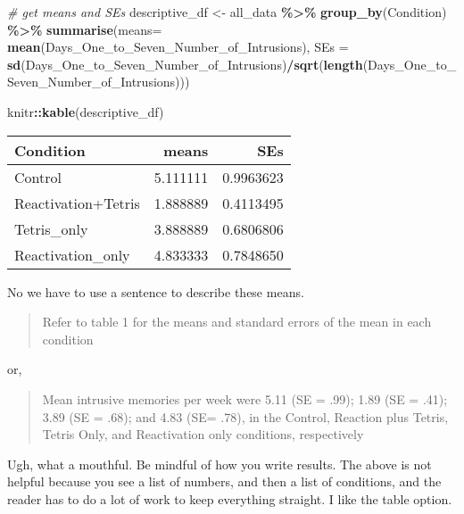 \documentclass[
]{book}
\newenvironment{Shaded}{\begin{snugshade}}{\end{snugshade}}
\newcommand{\AttributeTok}[1]{\textcolor[rgb]{0.13,0.29,0.53}{#1}}
\newcommand{\CommentTok}[1]{\textcolor[rgb]{0.56,0.35,0.01}{\textit{#1}}}
\newcommand{\FunctionTok}[1]{\textcolor[rgb]{0.13,0.29,0.53}{\textbf{#1}}}
\newcommand{\NormalTok}[1]{#1}
\newcommand{\OtherTok}[1]{\textcolor[rgb]{0.56,0.35,0.01}{#1}}
\newcommand{\SpecialCharTok}[1]{\textcolor[rgb]{0.81,0.36,0.00}{\textbf{#1}}}
\begin{document}
\begin{Shaded}
\begin{Highlighting}[]
\CommentTok{\# get means and SEs}
\NormalTok{descriptive\_df }\OtherTok{\textless{}{-}}\NormalTok{ all\_data }\SpecialCharTok{\%\textgreater{}\%} 
                    \FunctionTok{group\_by}\NormalTok{(Condition) }\SpecialCharTok{\%\textgreater{}\%} 
                    \FunctionTok{summarise}\NormalTok{(}\AttributeTok{means=} \FunctionTok{mean}\NormalTok{(Days\_One\_to\_Seven\_Number\_of\_Intrusions),}
                              \AttributeTok{SEs =} \FunctionTok{sd}\NormalTok{(Days\_One\_to\_Seven\_Number\_of\_Intrusions)}\SpecialCharTok{/}\FunctionTok{sqrt}\NormalTok{(}\FunctionTok{length}\NormalTok{(Days\_One\_to\_Seven\_Number\_of\_Intrusions)))}

\NormalTok{knitr}\SpecialCharTok{::}\FunctionTok{kable}\NormalTok{(descriptive\_df)}
\end{Highlighting}
\end{Shaded}

\begin{tabular}{l|r|r}
\hline
Condition & means & SEs\\
\hline
Control & 5.111111 & 0.9963623\\
\hline
Reactivation+Tetris & 1.888889 & 0.4113495\\
\hline
Tetris\_only & 3.888889 & 0.6806806\\
\hline
Reactivation\_only & 4.833333 & 0.7848650\\
\hline
\end{tabular}

No we have to use a sentence to describe these means.

\begin{quote}
Refer to table 1 for the means and standard errors of the mean in each condition
\end{quote}

or,

\begin{quote}
Mean intrusive memories per week were 5.11 (SE = .99); 1.89 (SE = .41); 3.89 (SE = .68); and 4.83 (SE= .78), in the Control, Reaction plus Tetris, Tetris Only, and Reactivation only conditions, respectively
\end{quote}

Ugh, what a mouthful. Be mindful of how you write results. The above is not helpful because you see a list of numbers, and then a list of conditions, and the reader has to do a lot of work to keep everything straight. I like the table option.
\end{document}
